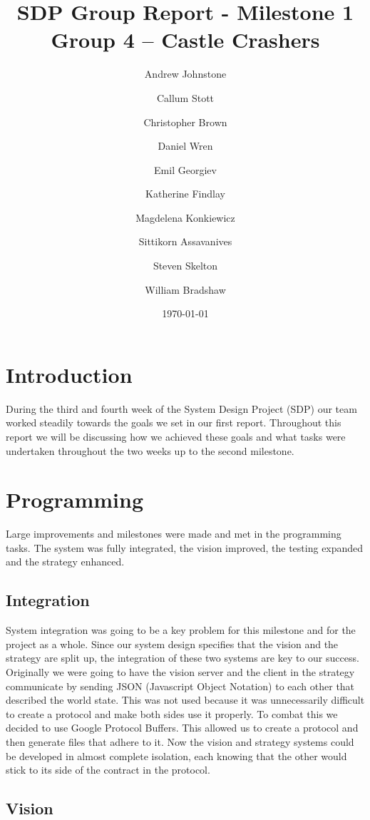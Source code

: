 \documentclass[12pt, a4paper, titlepage]{article}
\title{\small{SDP Group Report - Milestone 1} \\ \huge Group 4 -- Castle Crashers}
\author{Andrew Johnstone \and Callum Stott \and Christopher Brown \and Daniel Wren \and Emil Georgiev \and Katherine Findlay \and Magdelena Konkiewicz \and Sittikorn Assavanives \and Steven Skelton \and William Bradshaw}
\date{\today}
\begin{document}
\maketitle

\section{Introduction}

During the third and fourth week of the System Design Project (SDP) our team
worked steadily towards the goals we set in our first report. Throughout this
report we will be discussing how we achieved these goals and what tasks were
undertaken throughout the two weeks up to the second milestone.

\section{Programming}

Large improvements and milestones were made and met in the programming tasks.
The system was fully integrated, the vision improved, the testing expanded and
the strategy enhanced.

\subsection{Integration}

System integration was going to be a key problem for this milestone and for
the project as a whole. Since our system design specifies that the vision
and the strategy are split up, the integration of these two systems are
key to our success. Originally we were going to have the vision server and
the client in the strategy communicate by sending JSON (Javascript Object
Notation) to each other that described the world state. This was not used
because it was unnecessarily difficult to create a protocol and make both
sides use it properly. To combat this we decided to use Google Protocol
Buffers\cite{protobuf}. This allowed us to create a protocol and then generate
files that adhere to it. Now the vision and strategy systems could be developed
in almost complete isolation, each knowing that the other would stick to its
side of the contract in the protocol.

\subsection{Vision}
\end{document}
